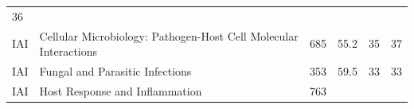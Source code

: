 \documentclass[11pt,]{article}
\begin{document}
\begin{longtable}[]{@{}llrrrr@{}}
\begin{minipage}[t]{0.11\columnwidth}
36\strut
\end{minipage}\tabularnewline
\begin{minipage}[t]{0.06\columnwidth}\raggedright\strut
IAI\strut
\end{minipage} & \begin{minipage}[t]{0.43\columnwidth}\raggedright\strut
Cellular Microbiology: Pathogen-Host Cell Molecular Interactions\strut
\end{minipage} & \begin{minipage}[t]{0.04\columnwidth}\raggedleft\strut
685\strut
\end{minipage} & \begin{minipage}[t]{0.08\columnwidth}\raggedleft\strut
55.2\strut
\end{minipage} & \begin{minipage}[t]{0.11\columnwidth}\raggedleft\strut
35\strut
\end{minipage} & \begin{minipage}[t]{0.11\columnwidth}\raggedleft\strut
37\strut
\end{minipage}\tabularnewline
\begin{minipage}[t]{0.06\columnwidth}\raggedright\strut
IAI\strut
\end{minipage} & \begin{minipage}[t]{0.43\columnwidth}\raggedright\strut
Fungal and Parasitic Infections\strut
\end{minipage} & \begin{minipage}[t]{0.04\columnwidth}\raggedleft\strut
353\strut
\end{minipage} & \begin{minipage}[t]{0.08\columnwidth}\raggedleft\strut
59.5\strut
\end{minipage} & \begin{minipage}[t]{0.11\columnwidth}\raggedleft\strut
33\strut
\end{minipage} & \begin{minipage}[t]{0.11\columnwidth}\raggedleft\strut
33\strut
\end{minipage}\tabularnewline
\begin{minipage}[t]{0.06\columnwidth}\raggedright\strut
IAI\strut
\end{minipage} & \begin{minipage}[t]{0.43\columnwidth}\raggedright\strut
Host Response and Inflammation\strut
\end{minipage} & \begin{minipage}[t]{0.04\columnwidth}\raggedleft\strut
763\strut
\end{minipage} & \begin{minipage}[t]{0.08\columnwidth}\raggedleft\strut

\end{minipage}
\end{longtable}
\end{document}
